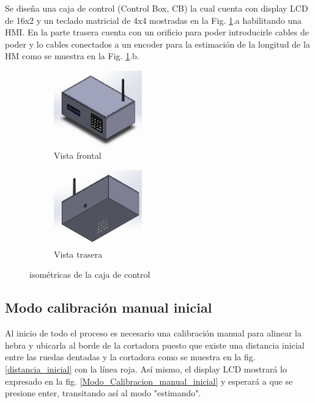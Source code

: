 \documentclass[main_conf.tex]{subfiles}
\begin{document}
Se diseña una caja de control (Control Box, CB) la cual cuenta
con display LCD de 16x2 y un teclado matricial de 4x4 mostradas
en la Fig. \ref{box:iso}.a habilitando una HMI. En la parte trasera
cuenta con un orificio para poder introducirle cables de poder y
lo cables conectados a un encoder para la estimación de la longitud
de la HM como se muestra en la Fig. \ref{box:iso}.b.

\begin{figure}[t]
  \centering
  \begin{subfigure}[b]{0.5\textwidth}
    \centering
    \includegraphics[width=1.5in]{../img/box/iso_front.png}
    \caption{Vista frontal}
  \end{subfigure}

  \begin{subfigure}[b]{0.5\textwidth}
    \centering
    \includegraphics[width=1.5in]{../img/box/iso_back.png}
    \caption{Vista trasera}
  \end{subfigure}

  \caption{isométricas de la caja de control}
  \label{box:iso}
\end{figure}


\subsection{Modo calibración manual inicial}
Al inicio de todo el proceso es necesario una calibración manual para
alinear la hebra y ubicarla al borde de la cortadora puesto que existe
una distancia inicial entre las ruedas dentadas y la cortadora como se
muestra en la fig. \ref{distancia_inicial} con la línea roja.
Así mismo, el display LCD mostrará lo expresado en la fig.
\ref{Modo_Calibracion_manual_inicial} y esperará a que se presione
enter, transitando así al modo "estimando".
\end{document}
